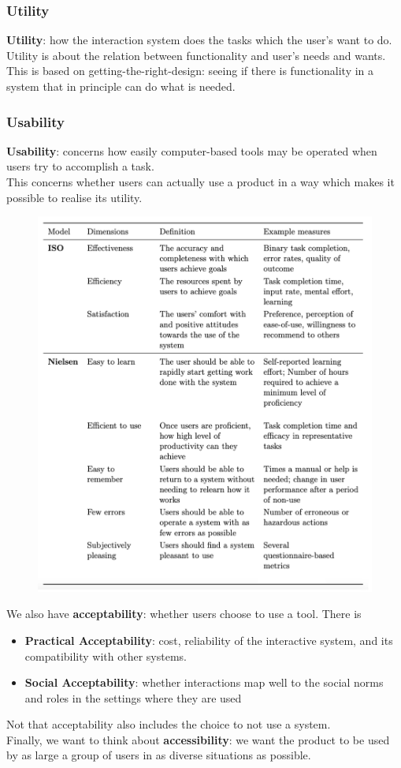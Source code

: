 \documentclass{article}
\begin{document}
\subsubsection{Utility}
\textbf{Utility}: how the interaction system does the tasks which the user's want to do. Utility is about the relation between functionality and user's needs and wants. This is based on getting-the-right-design: seeing if there is functionality in a system that in principle can do what is needed. 
\subsubsection{Usability}
\textbf{Usability}: concerns how easily computer-based tools may be operated when users try to accomplish a task. \\
This concerns whether users can actually use a product in a way which makes it possible to realise its utility.
\begin{figure}[H]
    \centering
    \includegraphics[width=0.4\linewidth]{Pictures/Screenshot 2023-03-01 at 12.08.59.png}
\end{figure}
We also have \textbf{acceptability}: whether users choose to use a tool. There is 
\begin{itemize}
    \item \textbf{Practical Acceptability}: cost, reliability of the interactive system, and its compatibility with other systems. 
    \item \textbf{Social Acceptability}: whether interactions map well to the social norms and roles in the settings where they are used
\end{itemize}
Not that acceptability also includes the choice to not use a system. \\
Finally, we want to think about \textbf{accessibility}: we want the product to be used by as large a group of users in as diverse situations as possible.
\end{document}
